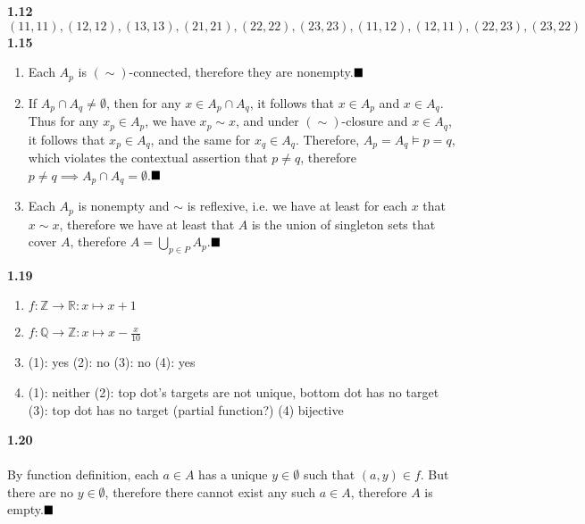 \documentclass{article}
\begin{document}
\textbf{1.12}
$$ (11,11),(12,12),(13,13),(21,21),(22,22),(23,23),(11,12),(12,11),(22,23),(23,22) $$
\textbf{1.15}
\begin{enumerate}
	\item Each $A_p$ is $(\sim )$-connected, therefore they are nonempty.$\hfill\blacksquare$
	\item If $A_p\cap A_q\neq\emptyset$, then for any $x\in A_p\cap A_q$, it follows  that $x\in A_p$ and $x\in A_q$. Thus for any $x_p\in A_p$, we have $x_p\sim x$, and under $(\sim )$-closure and $x\in A_q$, it follows that $x_p\in A_q$, and the same for $x_q\in A_q$. Therefore, $A_p=A_q \vDash p=q$, which violates the contextual assertion that $p\neq q$, therefore $p\neq q\implies A_p\cap A_q=\emptyset$.$\hfill\blacksquare$
	\item Each $A_p$ is nonempty and $\sim$ is reflexive, i.e. we have at least for each $x$ that $x\sim x$, therefore we have at least that $A$ is the union of singleton sets that cover $A$, therefore $A=\bigcup_{p\in P} A_p$.$\hfill\blacksquare$
\end{enumerate}\bigskip
\textbf{1.19}
\begin{enumerate}
	\item $f:\mathbb{Z}\rightarrow\mathbb{R}: x\mapsto x+1$
	\item $f:\mathbb{Q}\rightarrow\mathbb{Z}: x\mapsto x-\frac{x}{10}$
	\item (1): yes (2): no (3): no (4): yes 
	\item (1): neither (2): top dot's targets are not unique, bottom dot has no target (3): top dot has no target (partial function?) (4) bijective
\end{enumerate}\bigskip
\textbf{1.20}\\
 \\
By function definition, each $a\in A$ has a unique $y\in\emptyset$ such that $(a,y)\in f$. But there are no $y\in\emptyset$, therefore there cannot exist any such $a\in A$, therefore $A$ is empty.$\hfill\blacksquare$
\end{document}
